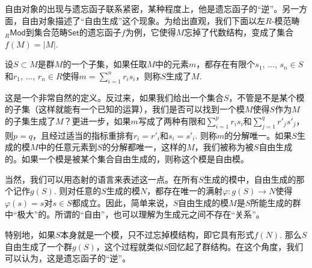 


自由对象的出现与遗忘函子联系紧密，某种程度上，他是遗忘函子的“逆”。另一方面，自由对象描述了“自由生成”这个现象。为给出直观，我们下面以左$R$-模范畴${}_R\mathsf{Mod}$到集合范畴$\mathsf{Set}$的遗忘函子$f$为例，它使得$M$忘掉了代数结构，变成了集合$f(M)=|M|$. 

\begin{para}
设$S\subset M$是群$M$的一个子集，如果任取$M$中的元素$m$，都存在有限个$s_1$, $\dots$, $s_n\in S$和$r_1$, $\dots$, $r_n\in R$使得$m=\sum_{i=1}^n r_is_i$，则称$S$生成了$M$.
\end{para}

这是一个非常自然的定义。反过来，如果我们给出一个集合$S$，不管是不是某个模的子集（这样就能有一个已知的运算），我们是否可以找到一个模$M$使得$S$作为$M$的子集生成了$M$？更进一步，如果$m$写成了两种有限和$\sum_{i=1}^p r_is_i$和$\sum_{j=1}^q r'_js'_j$，则$p=q$，且经过适当的指标重排有$r_i=r'_i$和$s_i=s'_i$. 则称$m$的分解唯一。如果$S$生成的模$M$中的任意元素到$S$的分解都唯一，这样的$M$，我们被称为被$S$自由生成的。如果一个模是被某个集合自由生成的，则称这个模是自由模。

当然，我们可以用态射的语言来表述这一点。在所有$S$生成的模中，自由生成的那个记作$g(S)$. 则对任意的$S$生成的模$N$，都存在唯一的满射$\varphi:g(S)\to N$使得$\varphi(s)=s$对$s\in S$都成立。因此，简单来说，$S$自由生成的模$M$是$S$所能生成的群中“极大”的。所谓的“自由”，也可以理解为生成元之间不存在“关系”。

特别地，如果$S$本身就是一个模，只不过忘掉模结构，即它具有形式$f(N)$. 那么$S$自由生成了一个群$g(S)$，这个过程就类似$S$回忆起了群结构。在这个角度，我们可以认为，这是遗忘函子的“逆”。

